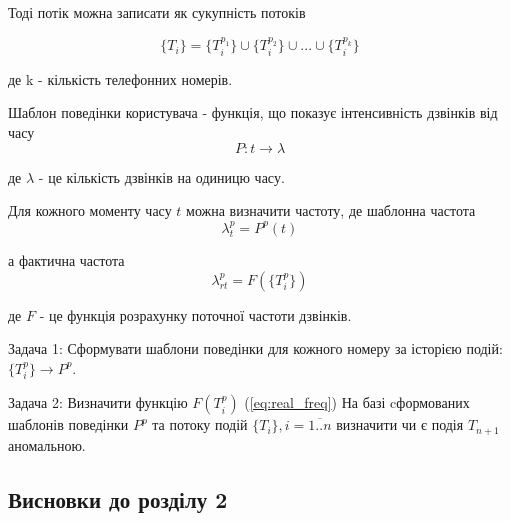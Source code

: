   Тоді потік можна записати як сукупність потоків 

  \begin{equation}\label{eq:stream_sum}\{T_i\} = \{T_i^{p_1}\} \cup \{T_i^{p_2}\} \cup ... \cup \{T_i^{p_k}\} \end{equation}
  \begin{ESKDexplanation}
    \item де k - кількість телефонних номерів.
  \end{ESKDexplanation}

  Шаблон поведінки користувача - функція, що показує інтенсивність дзвінків від часу
  \begin{equation}\label{eq:pattern}P: t \rightarrow \lambda \end{equation}

  \begin{ESKDexplanation}
    \item де $\lambda$ - це кількість дзвінків на одиницю часу.
  \end{ESKDexplanation}

  Для кожного моменту часу $t$ можна визначити частоту, де шаблонна частота 
\begin{equation}\label{eq:pattern_freq} \lambda_t^p = P^p(t) \end{equation}

  а фактична частота
 \begin{equation}\label{eq:real_freq} \lambda_{rt}^p = F(\{T_i^p\}) \end{equation}
 \begin{ESKDexplanation}
    \item де $F$ - це функція розрахунку поточної частоти дзвінків.
  \end{ESKDexplanation}

  Задача 1: Сформувати шаблони поведінки для кожного номеру за історією подій: $\{T_i^{p}\} \rightarrow P^{p}$.

  Задача 2: Визначити функцію $F({T_i^p})$ (\ref{eq:real_freq}) На базі cформованих шаблонів поведінки $P^{p}$ та потоку подій $\{T_i\}, i = \overline{1..n}$ визначити чи є подія $T_{n+1}$ аномальною.


\newpage
\subsection*{Висновки до розділу 2}

